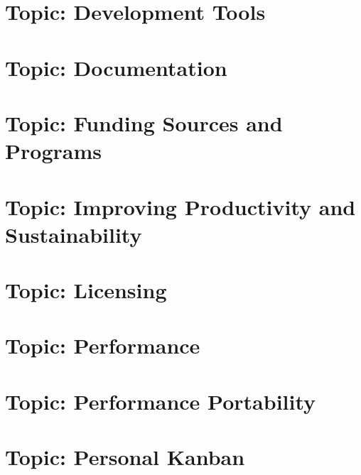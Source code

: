 \documentclass[twoside]{book}
\newcommand{\+}{\discretionary{\mbox{\scriptsize$\hookleftarrow$}}{}{}}
\begin{document}
\chapter{Topic\+: Development Tools}
\label{md_markdown_topic_development_tools}

\chapter{Topic\+: Documentation}
\label{md_markdown_topic_documentation}

\chapter{Topic\+: Funding Sources and Programs}
\label{md_markdown_topic_funding_sources_and_programs}

\chapter{Topic\+: Improving Productivity and Sustainability}
\label{md_markdown_topic_improving_productivity_and_sustanability}

\chapter{Topic\+: Licensing}
\label{md_markdown_topic_licensing}

\chapter{Topic\+: Performance}
\label{md_markdown_topic_performance}

\chapter{Topic\+: Performance Portability}
\label{md_markdown_topic_performance_portability}

\chapter{Topic\+: Personal Kanban}
\label{md_markdown_topic_personal_kanban}

\end{document}
